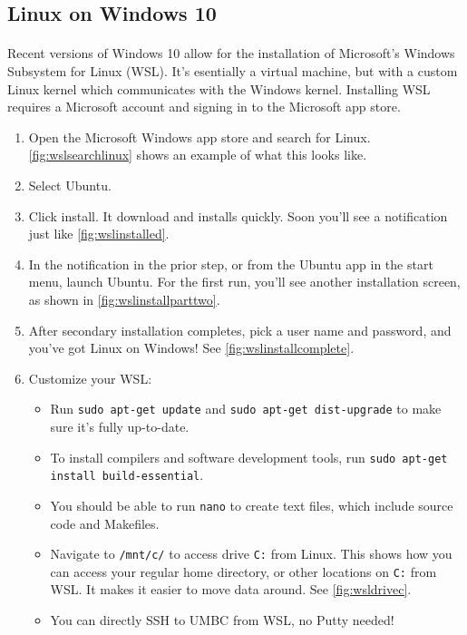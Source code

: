 \documentclass[letter,11pt]{article}
\begin{document}
\FloatBarrier
\subsection{Linux on Windows 10}
\paragraph{}Recent versions of Windows 10 allow for the installation of Microsoft's Windows Subsystem for Linux (WSL). It's esentially a virtual machine, but with a custom Linux kernel which communicates with the Windows kernel. Installing WSL requires a Microsoft account and signing in to the Microsoft app store.

\begin{enumerate}
    \item Open the Microsoft Windows app store and search for Linux. \autoref{fig:wslsearchlinux} shows an example of what this looks like.
    \item Select Ubuntu.
    \item Click install. It download and installs quickly. Soon you'll see a notification just like \autoref{fig:wslinstalled}.
    \item In the notification in the prior step, or from the Ubuntu app in the start menu, launch Ubuntu. For the first run, you'll see another installation screen, as shown in \autoref{fig:wslinstallparttwo}.
    \item After secondary installation completes, pick a user name and password, and you've got Linux on Windows! See \autoref{fig:wslinstallcomplete}.
    \item Customize your WSL:
    \begin{itemize}
        \item Run \texttt{sudo apt-get update} and \texttt{sudo apt-get dist-upgrade} to make sure it's fully up-to-date.
        \item To install compilers and software development tools, run \texttt{sudo apt-get install build-essential}.
        \item You should be able to run \texttt{nano} to create text files, which include source code and Makefiles.
        \item Navigate to \texttt{/mnt/c/} to access drive \texttt{C:} from Linux. This shows how you can access your regular home directory, or other locations on \texttt{C:} from WSL. It makes it easier to move data around. See \autoref{fig:wsldrivec}.
        \item You can directly SSH to UMBC from WSL, no Putty needed!
    \end{itemize}
\end{enumerate}
\end{document}
